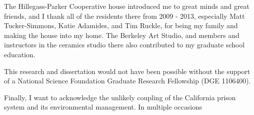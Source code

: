 The Hillegass-Parker Cooperative house introduced me to great minds and great friends, and I thank all of the residents there from 2009 - 2013, especially Matt Tucker-Simmons, Katie Adamides, and Tim Ruckle, for being my family and making the house into my home. The Berkeley Art Studio, and members and instructors in the ceramics studio there also contributed to my graduate school education. 

This research and dissertation would not have been possible without the support of a National Science Foundation Graduate Research Fellowship (DGE 1106400).

Finally, I want to acknowledge the unlikely coupling of the California prison system and its environmental management. In multiple occasions